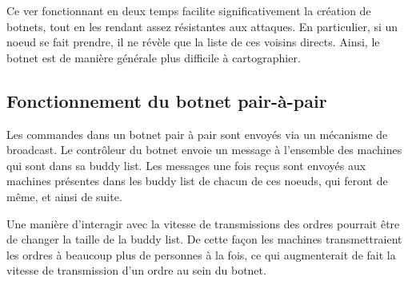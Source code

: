 Ce ver fonctionnant en deux temps facilite significativement la création de
botnets, tout en les rendant assez résistantes aux attaques. En particulier,
si un noeud se fait prendre, il ne révèle que la liste de ces voisins directs.
Ainsi, le botnet est de manière générale plus difficile à cartographier.

\subsection{Fonctionnement du botnet pair-à-pair}

Les commandes dans un botnet pair à pair sont envoyés via un mécanisme de
broadcast.  Le contrôleur du botnet envoie un message à l'ensemble des
machines qui sont dans sa buddy list.  Les messages une fois reçus sont envoyés
aux machines présentes dans les buddy list de chacun de ces noeuds, qui feront
de même, et ainsi de suite.

Une manière d'interagir avec la vitesse de transmissions des ordres pourrait
être de changer la taille de la buddy list. De cette façon les machines
transmettraient les ordres à beaucoup plus de personnes à la fois, ce qui
augmenterait de fait la vitesse de transmission d'un ordre au sein du botnet.
